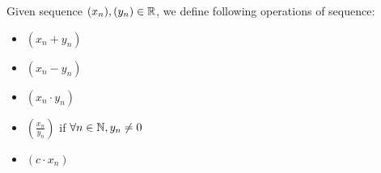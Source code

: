 \documentclass[a4paper,12pt]{article}
\begin{document}
\begin{definition}
    Given sequence \((x_{n}), (y_{n})\in\mathbb{R}\),
    we define following operations of sequence:
    \begin{itemize}
        \item {} \((x_n+y_n)\)
        \item {} \((x_n-y_n)\)
        \item {} \((x_n\cdot y_n)\)
        \item {} \((\frac{x_n}{y_n})\) if \(\forall n\in\mathbb{N}, y_n\neq 0\)
        \item {} \((c\cdot x_n)\)\\
    \end{itemize}
\end{definition}
\end{document}
